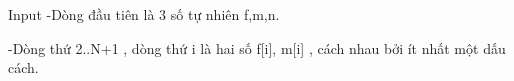 Input
-Dòng đầu tiên là 3 số tự nhiên f,m,n.  

   -Dòng thứ 2..N+1 , dòng thứ i là hai số f[i], m[i] , cách nhau bởi ít nhất một dấu cách.